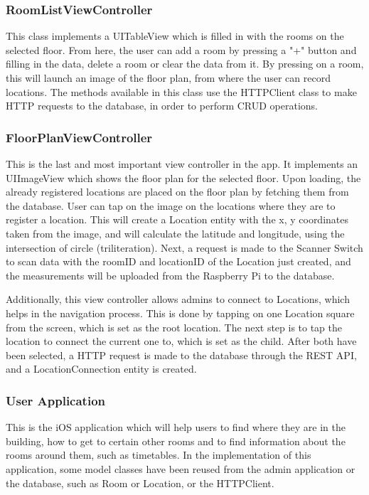 \subsubsection*{RoomListViewController}
This class implements a UITableView which is filled in with the rooms on the selected floor. From here, the user can add a room by pressing a "+" button and filling in the data, delete a room or clear the data from it. By pressing on a room, this will launch an image of the floor plan, from where the user can record locations. The methods available in this class use the HTTPClient class to make HTTP requests to the database, in order to perform CRUD operations.

\subsubsection*{FloorPlanViewController}
This is the last and most important view controller in the app. It implements an UIImageView which shows the floor plan for the selected floor. Upon loading, the already registered locations are placed on the floor plan by fetching them from the database. User can tap on the image on the locations where they are to register a location. This will create a Location entity with the x, y coordinates taken from the image, and will calculate the latitude and longitude, using the intersection of circle (triliteration). Next, a request is made to the Scanner Switch to scan data with the roomID and locationID of the Location just created, and the measurements will be uploaded from the Raspberry Pi to the database. 

Additionally, this view controller allows admins to connect to Locations, which helps in the  navigation process. This is done by tapping on one Location square from the screen, which is set as the root location. The next step is to tap the location to connect the current one to, which is set as the child. After both have been selected, a HTTP request is made to the database through the REST API, and a LocationConnection entity is created.

\subsubsection{User Application}
This is the iOS application which will help users to find where they are in the building, how to get to certain other rooms and to find information about the rooms around them, such as timetables. In the implementation of this application, some model classes have been reused from the admin application or the database, such as Room or Location, or the HTTPClient.

